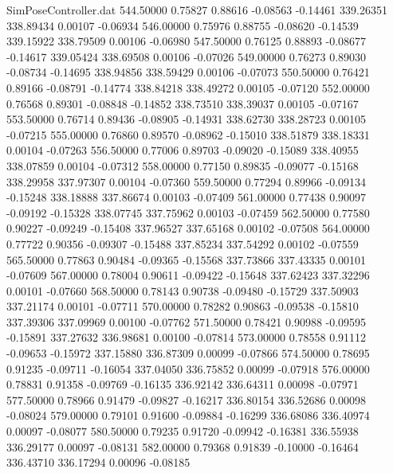 \begin{filecontents}{SimPoseController.dat}
 544.50000    0.75827    0.88616    -0.08563   -0.14461  339.26351  338.89434    0.00107   -0.06934
 546.00000    0.75976    0.88755    -0.08620   -0.14539  339.15922  338.79509    0.00106   -0.06980
 547.50000    0.76125    0.88893    -0.08677   -0.14617  339.05424  338.69508    0.00106   -0.07026
 549.00000    0.76273    0.89030    -0.08734   -0.14695  338.94856  338.59429    0.00106   -0.07073
 550.50000    0.76421    0.89166    -0.08791   -0.14774  338.84218  338.49272    0.00105   -0.07120
 552.00000    0.76568    0.89301    -0.08848   -0.14852  338.73510  338.39037    0.00105   -0.07167
 553.50000    0.76714    0.89436    -0.08905   -0.14931  338.62730  338.28723    0.00105   -0.07215
 555.00000    0.76860    0.89570    -0.08962   -0.15010  338.51879  338.18331    0.00104   -0.07263
 556.50000    0.77006    0.89703    -0.09020   -0.15089  338.40955  338.07859    0.00104   -0.07312
 558.00000    0.77150    0.89835    -0.09077   -0.15168  338.29958  337.97307    0.00104   -0.07360
 559.50000    0.77294    0.89966    -0.09134   -0.15248  338.18888  337.86674    0.00103   -0.07409
 561.00000    0.77438    0.90097    -0.09192   -0.15328  338.07745  337.75962    0.00103   -0.07459
 562.50000    0.77580    0.90227    -0.09249   -0.15408  337.96527  337.65168    0.00102   -0.07508
 564.00000    0.77722    0.90356    -0.09307   -0.15488  337.85234  337.54292    0.00102   -0.07559
 565.50000    0.77863    0.90484    -0.09365   -0.15568  337.73866  337.43335    0.00101   -0.07609
 567.00000    0.78004    0.90611    -0.09422   -0.15648  337.62423  337.32296    0.00101   -0.07660
 568.50000    0.78143    0.90738    -0.09480   -0.15729  337.50903  337.21174    0.00101   -0.07711
 570.00000    0.78282    0.90863    -0.09538   -0.15810  337.39306  337.09969    0.00100   -0.07762
 571.50000    0.78421    0.90988    -0.09595   -0.15891  337.27632  336.98681    0.00100   -0.07814
 573.00000    0.78558    0.91112    -0.09653   -0.15972  337.15880  336.87309    0.00099   -0.07866
 574.50000    0.78695    0.91235    -0.09711   -0.16054  337.04050  336.75852    0.00099   -0.07918
 576.00000    0.78831    0.91358    -0.09769   -0.16135  336.92142  336.64311    0.00098   -0.07971
 577.50000    0.78966    0.91479    -0.09827   -0.16217  336.80154  336.52686    0.00098   -0.08024
 579.00000    0.79101    0.91600    -0.09884   -0.16299  336.68086  336.40974    0.00097   -0.08077
 580.50000    0.79235    0.91720    -0.09942   -0.16381  336.55938  336.29177    0.00097   -0.08131
 582.00000    0.79368    0.91839    -0.10000   -0.16464  336.43710  336.17294    0.00096   -0.08185

\end{filecontents}
